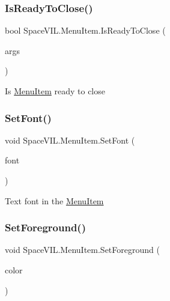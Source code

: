 \subsubsection{\texorpdfstring{Is\+Ready\+To\+Close()}{IsReadyToClose()}}
{\footnotesize\ttfamily bool Space\+V\+I\+L.\+Menu\+Item.\+Is\+Ready\+To\+Close (\begin{DoxyParamCaption}\item[{\mbox{\hyperlink{class_space_v_i_l_1_1_core_1_1_mouse_args}{Mouse\+Args}}}]{args }\end{DoxyParamCaption})\hspace{0.3cm}{\ttfamily [inline]}}



Is \mbox{\hyperlink{class_space_v_i_l_1_1_menu_item}{Menu\+Item}} ready to close 

\mbox{\label{class_space_v_i_l_1_1_menu_item_a8f81cd6c91a758c5040c0fff74d803eb}} 
\subsubsection{\texorpdfstring{Set\+Font()}{SetFont()}}
{\footnotesize\ttfamily void Space\+V\+I\+L.\+Menu\+Item.\+Set\+Font (\begin{DoxyParamCaption}\item[{Font}]{font }\end{DoxyParamCaption})\hspace{0.3cm}{\ttfamily [inline]}}



Text font in the \mbox{\hyperlink{class_space_v_i_l_1_1_menu_item}{Menu\+Item}} 

\mbox{\label{class_space_v_i_l_1_1_menu_item_ab66887ca29fcd817a4b4505e92e01919}} 
\subsubsection{\texorpdfstring{Set\+Foreground()}{SetForeground()}}
{\footnotesize\ttfamily void Space\+V\+I\+L.\+Menu\+Item.\+Set\+Foreground (\begin{DoxyParamCaption}\item[{Color}]{color }\end{DoxyParamCaption})\hspace{0.3cm}{\ttfamily [inline]}}



